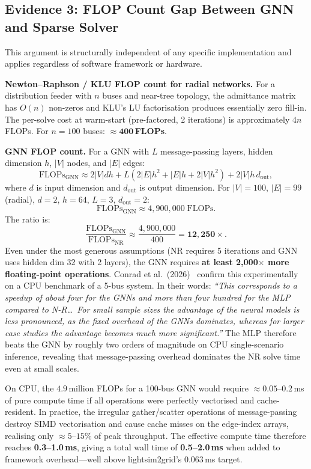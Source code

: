 \documentclass[11pt]{article}
\begin{document}
\subsection{Evidence 3: FLOP Count Gap Between GNN and Sparse Solver}

This argument is structurally independent of any specific implementation
and applies regardless of software framework or hardware.

\textbf{Newton--Raphson / KLU FLOP count for radial networks.}
For a distribution feeder with $n$ buses and near-tree topology, the
admittance matrix has $O(n)$ non-zeros and KLU's LU factorisation
produces essentially zero fill-in.  The per-solve cost at warm-start
(pre-factored, 2 iterations) is approximately $4n$ FLOPs.
For $n = 100$ buses: $\mathbf{{\approx}400}$\,\textbf{FLOPs}.

\textbf{GNN FLOP count.}
For a GNN with $L$ message-passing layers, hidden dimension $h$,
$|V|$ nodes, and $|E|$ edges:
\[
\text{FLOPs}_{\text{GNN}}
  \approx 2|V|dh
  + L\!\left(2|E|h^2 + |E|h + 2|V|h^2\right)
  + 2|V|h\,d_{\text{out}},
\]
where $d$ is input dimension and $d_{\text{out}}$ is output dimension.
For $|V|=100$, $|E|=99$ (radial), $d=2$, $h=64$, $L=3$,
$d_{\text{out}}=2$:
\[
\text{FLOPs}_{\text{GNN}} \approx 4{,}900{,}000\;\text{FLOPs}.
\]
The ratio is:
\[
\frac{\text{FLOPs}_{\text{GNN}}}{\text{FLOPs}_{\text{NR}}}
\approx \frac{4{,}900{,}000}{400} = \mathbf{12{,}250\times.}
\]
Even under the most generous assumptions (NR requires 5 iterations and
GNN uses hidden dim 32 with 2 layers), the GNN requires
\textbf{at least 2,000$\times$ more floating-point operations}.
Conrad et al.\ (2026)~\cite{Conrad2026} confirm this experimentally on a
CPU benchmark of a 5-bus system.  In their words: \textit{``This corresponds
to a speedup of about four for the GNNs and more than four hundred for the
MLP compared to N-R\ldots\ For small sample sizes the advantage of the neural
models is less pronounced, as the fixed overhead of the GNNs dominates,
whereas for larger case studies the advantage becomes much more
significant.''}  The MLP therefore beats the GNN by roughly two orders of
magnitude on CPU single-scenario inference, revealing that message-passing
overhead dominates the NR solve time even at small scales.

On CPU, the $4.9$\,million FLOPs for a 100-bus GNN would require
${\approx}0.05$--$0.2$\,ms of pure compute time if all operations were
perfectly vectorised and cache-resident.  In practice, the irregular
gather/scatter operations of message-passing destroy SIMD vectorisation and
cause cache misses on the edge-index arrays, realising only ${\approx}5$--$15\%$
of peak throughput.  The effective compute time therefore reaches
\textbf{0.3--1.0\,ms}, giving a total wall time of \textbf{0.5--2.0\,ms}
when added to framework overhead---well above lightsim2grid's $0.063$\,ms
target.
\end{document}
